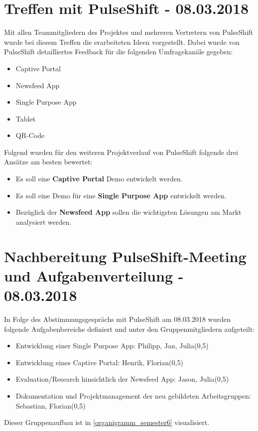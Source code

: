\section{Treffen mit PulseShift - 08.03.2018}
\label{sec:events:definition_of_channels_for_poc}
Mit allen Teammitgliedern des Projektes und mehreren Vertretern von PulseShift wurde bei diesem Treffen die erarbeiteten Ideen vorgestellt. Dabei wurde von PulseShift detailliertes Feedback für die folgenden Umfragekanäle gegeben:
\begin{itemize}
\item Captive Portal
\item Newsfeed App
\item Single Purpose App
\item Tablet
\item QR-Code
\end{itemize}
Folgend wurden für den weiteren Projektverlauf von PulseShift folgende drei Ansätze am besten bewertet:
\begin{itemize}
\item Es soll eine \textbf{Captive Portal} Demo entwickelt werden.
\item Es soll eine Demo für eine \textbf{Single Purpose App} entwickelt werden.
\item Bezüglich der \textbf{Newsfeed App}  sollen die wichtigsten Lösungen am Markt analysiert werden.
\end{itemize}

\section{Nachbereitung PulseShift-Meeting und Aufgabenverteilung - 08.03.2018}
In Folge des Abstimmungsgesprächs mit PulseShift am 08.03.2018 wurden folgende Aufgabenbereiche definiert und unter den Gruppenmitgliedern aufgeteilt:
\begin{itemize}
\item Entwicklung einer Single Purpose App: Philipp, Jan, Julia(0,5)
\item Entwicklung eines Captive Portal: Henrik, Florian(0,5)
\item Evaluation/Research hinsichtlich der Newsfeed App: Jason, Julia(0,5)
\item Dokumentation und Projektmanagement der neu gebildeten Arbeitsgruppen: Sebastian, Florian(0,5)
\end{itemize}
Dieser Gruppenaufbau ist in \vref{organigramm_semester6} visualisiert.

